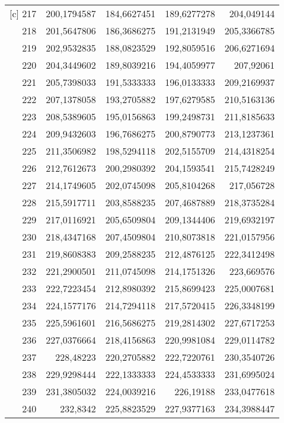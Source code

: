 \begin{longtable}{r|rrrr}[c]
    217   & 200,1794587 & 184,6627451 & 189,6277278 & 204,049144 \\
    218   & 201,5647806 & 186,3686275 & 191,2131949 & 205,3366785 \\
    219   & 202,9532835 & 188,0823529 & 192,8059516 & 206,6271694 \\
    220   & 204,3449602 & 189,8039216 & 194,4059977 & 207,92061 \\
    221   & 205,7398033 & 191,5333333 & 196,0133333 & 209,2169937 \\
    222   & 207,1378058 & 193,2705882 & 197,6279585 & 210,5163136 \\
    223   & 208,5389605 & 195,0156863 & 199,2498731 & 211,8185633 \\
    224   & 209,9432603 & 196,7686275 & 200,8790773 & 213,1237361 \\
    225   & 211,3506982 & 198,5294118 & 202,5155709 & 214,4318254 \\
    226   & 212,7612673 & 200,2980392 & 204,1593541 & 215,7428249 \\
    227   & 214,1749605 & 202,0745098 & 205,8104268 & 217,056728 \\
    228   & 215,5917711 & 203,8588235 & 207,4687889 & 218,3735284 \\
    229   & 217,0116921 & 205,6509804 & 209,1344406 & 219,6932197 \\
    230   & 218,4347168 & 207,4509804 & 210,8073818 & 221,0157956 \\
    231   & 219,8608383 & 209,2588235 & 212,4876125 & 222,3412498 \\
    232   & 221,2900501 & 211,0745098 & 214,1751326 & 223,669576 \\
    233   & 222,7223454 & 212,8980392 & 215,8699423 & 225,0007681 \\
    234   & 224,1577176 & 214,7294118 & 217,5720415 & 226,3348199 \\
    235   & 225,5961601 & 216,5686275 & 219,2814302 & 227,6717253 \\
    236   & 227,0376664 & 218,4156863 & 220,9981084 & 229,0114782 \\
    237   & 228,48223 & 220,2705882 & 222,7220761 & 230,3540726 \\
    238   & 229,9298444 & 222,1333333 & 224,4533333 & 231,6995024 \\
    239   & 231,3805032 & 224,0039216 & 226,19188 & 233,0477618 \\
    240   & 232,8342 & 225,8823529 & 227,9377163 & 234,3988447 \\

\end{longtable}
